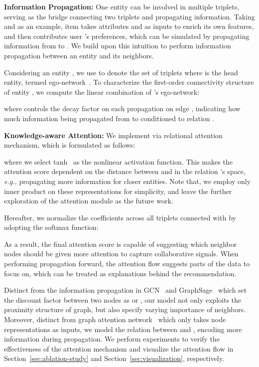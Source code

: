 \documentclass[sigconf]{acmart}
\newcommand{\eg}{\emph{e.g., }}
\theoremstyle{definition}
\begin{document}
\vspace{5px}
\noindent\textbf{Information Propagation:}
One entity can be involved in multiple triplets, serving as the bridge connecting two triplets and propagating information.
Taking  and  as an example, item  takes attributes  and  as inputs to enrich its own features, and then contributes user 's preferences, which can be simulated by propagating information from  to .
We build upon this intuition to perform information propagation between an entity and its neighbors.



Considering an entity , we use  to denote the set of triplets where  is the head entity, termed ego-network~\cite{DeepInf}.
To characterize the first-order connectivity structure of entity , we compute the linear combination of 's ego-network:

where  controls the decay factor on each propagation on edge , indicating how much information being propagated from  to  conditioned to relation .






\vspace{5px}
\noindent\textbf{Knowledge-aware Attention:}
We implement  via relational attention mechanism, which is formulated as follows:

where we select tanh~\cite{GAT} as the nonlinear activation function.
This makes the attention score dependent on the distance between  and  in the relation 's space, \eg propagating more information for closer entities.
Note that, we employ only inner product on these representations for simplicity, and leave the further exploration of the attention module as the future work.

Hereafter, we normalize the coefficients across all triplets connected with  by adopting the softmax function:

As a result, the final attention score is capable of suggesting which neighbor nodes should be given more attention to capture collaborative signals.
When performing propagation forward, the attention flow suggests parts of the data to focus on, which can be treated as explanations behind the recommendation.






Distinct from the information propagation in GCN~\cite{GCN} and GraphSage~\cite{GraphSage} which set the discount factor between two nodes as  or , our model not only exploits the proximity structure of graph, but also specify varying importance of neighbors.
Moreover, distinct from graph attention network~\cite{GAT} which only takes node representations as inputs, we model the relation  between  and , encoding more information during propagation.
We perform experiments to verify the effectiveness of the attention mechanism and visualize the attention flow in Section~\ref{sec:ablation-study} and Section~\ref{sec:visualization}, respectively.
\end{document}

